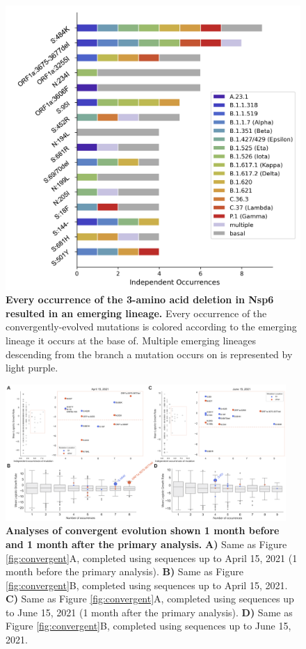 \documentclass[11pt,oneside,letterpaper]{article}
\begin{document}
\begin{figure}[h!]
	\centerline{\includegraphics[scale=0.55]{fig4_supp_emerginglineages.png}}
	\caption{\textbf{Every occurrence of the 3-amino acid deletion in Nsp6 resulted in an emerging lineage.}
	Every occurrence of the convergently-evolved mutations is colored according to the emerging lineage it occurs at the base of. Multiple emerging lineages descending from the branch a mutation occurs on is represented by light purple.
	}
	\label{fig:emerginglineages}
\end{figure}

\begin{figure}[h!]
	\centerline{\includegraphics[width=0.95\textwidth]{fig4_supp_convergentovertime.png}}
	\caption{\textbf{Analyses of convergent evolution shown 1 month before and 1 month after the primary analysis.}
	\textbf{A)} Same as Figure \ref{fig:convergent}A, completed using sequences up to April 15, 2021 (1 month before the primary analysis). \textbf{B)} Same as Figure \ref{fig:convergent}B, completed using sequences up to April 15, 2021. \textbf{C)} Same as Figure \ref{fig:convergent}A, completed using sequences up to June 15, 2021 (1 month after the primary analysis). \textbf{D)} Same as Figure \ref{fig:convergent}B, completed using sequences up to June 15, 2021.
	}
	\label{fig:convergentovertime}
\end{figure}
\end{document}

